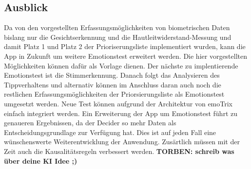 \subsection{Ausblick}
Da von den vorgestellten Erfassungsmöglichkeiten von biometrischen Daten bislang nur die Gesichtserkennung und die Hautleitwiderstand-Messung und damit Platz 1 und Platz 2 der Prioriserungsliste implementiert wurden, kann die App in Zukunft um weitere Emotionstest erweitert werden. Die hier vorgestellten Möglichkeiten können dafür als Vorlage dienen. Der nächste zu implentierende Emotionstest ist die Stimmerkennung. Danach folgt das Analysieren des Tippverhaltens und alternativ können im Anschluss daran auch noch die restlichen Erfassungsmöglichkeiten der Priorsierungsliste als Emotionstest umgesetzt werden. Neue Test können aufgrund der Architektur von emoTrix einfach integriert werden. \newline
Ein Erweiterung der App um Emotionstest führt zu genaueren Ergebnissen, da der Decider so mehr Daten als Entscheidungsgrundlage zur Verfügung hat. Dies ist auf jeden Fall eine wünschenswerte Weiterentwicklung der Anwendung.\newline
Zusärtlich müssen mit der Zeit auch die Kausalitätsregeln verbessert werden. \textbf{TORBEN: schreib was über deine KI Idee ;)} 

